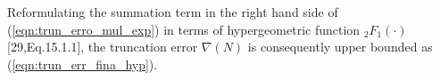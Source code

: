 \documentclass[12pt,onecolumn,draftcls]{IEEEtran}
\newcommand{\bs}{\boldsymbol}
\begin{document}
Reformulating the summation term in the right hand side of (\ref{eqn:trun_erro_mul_exp}) in terms of hypergeometric function ${}_2F_1(\cdot)$ [29,Eq.15.1.1], the truncation error $\nabla(N)$ is consequently upper bounded as (\ref{eqn:trun_err_fina_hyp}).
\end{document}
